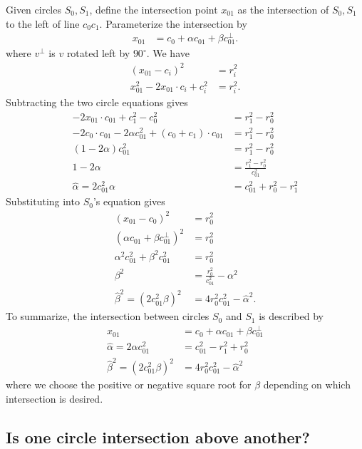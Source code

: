 \documentclass[11pt]{article}
\newcommand{\halpha}{\hat{\alpha}}
\newcommand{\hbeta}{\hat{\beta}}
\begin{document}
Given circles $S_0, S_1$, define the intersection point $x_{01}$ as the intersection
of $S_0,S_1$ to the left of line $c_0c_1$.  Parameterize the intersection by
\begin{align*}
x_{01} &= c_0 + \alpha c_{01} + \beta c_{01}^\perp.
\end{align*}
where $v^\perp$ is $v$ rotated left by $90^\circ$.  We have
\begin{align*}
(x_{01} - c_i)^2 &= r_i^2 \\
x_{01}^2 - 2x_{01} \cdot c_i + c_i^2 &= r_i^2.
\end{align*}
Subtracting the two circle equations gives
\begin{align*}
-2x_{01} \cdot c_{01} + c_1^2 - c_0^2 &= r_1^2 - r_0^2 \\
-2c_0 \cdot c_{01} -2\alpha c_{01}^2 + (c_0 + c_1) \cdot c_{01} &= r_1^2 - r_0^2 \\
(1-2\alpha) c_{01}^2 &= r_1^2 - r_0^2 \\
1 - 2 \alpha &= \frac{r_1^2 - r_0^2}{c_{01}^2} \\
\halpha = 2 c_{01}^2 \alpha &= c_{01}^2 + r_0^2 - r_1^2
\end{align*}
Substituting into $S_0$'s equation gives
\begin{align*}
(x_{01} - c_0)^2 &= r_0^2 \\
\left(\alpha c_{01} + \beta c_{01}^\perp \right)^2 &= r_0^2 \\
\alpha^2 c_{01}^2 + \beta^2 c_{01}^2 &= r_0^2 \\
\beta^2 &= \frac{r_0^2}{c_{01}^2} - \alpha^2 \\
\hbeta^2 = \left(2 c_{01}^2 \beta\right)^2 &= 4 r_0^2 c_{01}^2 - \halpha^2.
\end{align*}
To summarize, the intersection between circles $S_0$ and $S_1$ is described by
\begin{align*}
x_{01} &= c_0 + \alpha c_{01} + \beta c_{01}^\perp \\
\halpha = 2 \alpha c_{01}^2 &= c_{01}^2 - r_1^2 + r_0^2 \\
\hbeta^2 = (2c_{01}^2 \beta)^2 &= 4 r_0^2 c_{01}^2 - \halpha^2
\end{align*}
where we choose the positive or negative square root for $\beta$ depending on which intersection is desired.

\subsection{Is one circle intersection above another?}
\end{document}
